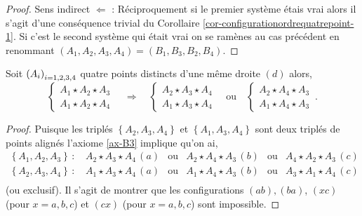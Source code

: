 \begin{cor}
\begin{proof}
        {Sens indirect $\Leftarrow$ : }Réciproquement si le premier système étais vrai alors il s'agit d'une conséquence trivial du Corollaire \ref{cor-configurationordrequatrepoint-1}. Si c'est le second système qui était vrai on se ramènes au cas précédent en renommant $(A_1,A_2,A_3,A_4)=(B_1,B_3,B_2,B_4)$.
    \end{proof}
\end{cor}
\begin{cor}\label{cor-configurationuncote}
    Soit $\left(A_{i}\right)_{i = 1,2,3,4}$ quatre points distincts d'une même droite $(d)$ alors,
    \begin{equation*}
        \left\{
        \begin{array}{cc}
             A_1 \star A_2 \star A_3  \\
             A_1 \star A_2 \star A_4 
        \end{array}
        \right. \quad \Longrightarrow \quad       
        \left\{\begin{array}{cc}
             A_2 \star A_3 \star A_4  \\
             A_1 \star A_3 \star A_4 
        \end{array}\right. \quad \text{ou} \quad
        \left\{\begin{array}{cc}
             A_2 \star A_4 \star A_3  \\
             A_1 \star A_4 \star A_3 
        \end{array}\right.\,.
    \end{equation*}
    \begin{proof}
        Puisque les triplés $\left\{A_2,A_3,A_4\right\}$ et $\left\{A_1,A_3,A_4\right\}$ sont deux triplés de points alignés l'axiome \ref{ax-B3} implique qu'on ai,
        \begin{equation*}
            \begin{array}{cccccc}
                 \left\{A_1,A_2,A_3\right\}\,:\,& A_2 \star A_3 \star A_4 \,(a) & \text{ou} & A_2 \star A_4 \star A_3 \,(b) & \text{ou} & A_4 \star A_2 \star A_3 \,(c) \\
                 \left\{A_2,A_3,A_4\right\}\,:\,& A_1 \star A_3 \star A_4 \,(a) & \text{ou} & A_1 \star A_4 \star A_3 \,(b) & \text{ou} & A_3 \star A_1 \star A_4 \,(c) \\
            \end{array}
        \end{equation*}
        (ou exclusif). Il s'agit de montrer que les configurations $(ab),(ba)$, $(xc)$ (pour $x=a,b,c$) et $(cx)$ (pour $x=a,b,c$) sont impossible.


\end{proof}
\end{cor}
